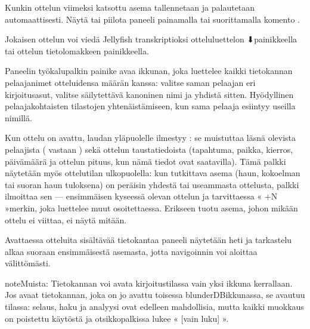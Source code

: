 \documentclass[letterpaper,10pt,finnish]{sphinxmanual}
\begin{document}
\sphinxAtStartPar
Kunkin ottelun viimeksi katsottu asema tallennetaan ja palautetaan automaattisesti. Näytä tai piilota paneeli painamalla  tai suorittamalla komento .

\sphinxAtStartPar
Jokaisen ottelun voi viedä Jellyfish  \sphinxhyphen{}transkriptioksi otteluluettelon ⬇\sphinxhyphen{}painikkeella tai ottelun tietolomakkeen \sphinxhyphen{}painikkeella.

\sphinxAtStartPar
Paneelin työkalupalkin  \sphinxhyphen{}painike avaa ikkunan, joka luettelee kaikki tietokannan pelaajanimet otteluidensa määrän kanssa: valitse saman pelaajan eri kirjoitusasut, valitse säilytettävä kanoninen nimi ja yhdistä sitten. Hyödyllinen pelaajakohtaisten tilastojen yhtenäistämiseen, kun sama pelaaja esiintyy useilla nimillä.

\sphinxAtStartPar
Kun ottelu on avattu, laudan yläpuolelle ilmestyy : se muistuttaa läsnä olevista pelaajista ( vastaan ) sekä ottelun taustatiedoista (tapahtuma, paikka, kierros, päivämäärä ja ottelun pituus, kun nämä tiedot ovat saatavilla). Tämä palkki näytetään myös ottelutilan ulkopuolella: kun tutkittava asema (haun, kokoelman tai suoran haun tuloksena) on peräisin yhdestä tai useammasta ottelusta, palkki ilmoittaa sen  — ensimmäisen kyseessä olevan ottelun ja tarvittaessa « +N »\sphinxhyphen{}merkin, joka luettelee muut osoitettaessa. Erikseen tuotu asema, johon mikään ottelu ei viittaa, ei näytä mitään.

\sphinxAtStartPar
Avattaessa otteluita sisältävää tietokantaa \sphinxhyphen{}paneeli näytetään heti ja tarkastelu alkaa suoraan ensimmäisestä asemasta, jotta navigoinnin voi aloittaa välittömästi.

\begin{sphinxadmonition}{note}{Muista:}
\sphinxAtStartPar
Tietokannan voi avata kirjoitustilassa vain yksi ikkuna kerrallaan. Jos avaat tietokannan, joka on jo avattu toisessa blunderDB\sphinxhyphen{}ikkunassa, se avautuu  \sphinxhyphen{}tilassa: selaus, haku ja analyysi ovat edelleen mahdollisia, mutta kaikki muokkaus on poistettu käytöstä ja otsikkopalkissa lukee « {[}vain luku{]} ».
\end{sphinxadmonition}
\end{document}
